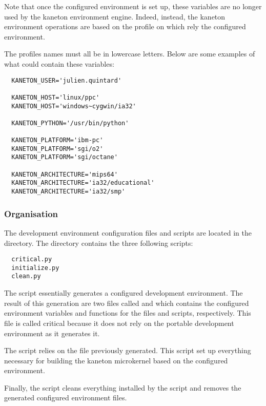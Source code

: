 Note that once the configured environment is set up, these variables are
no longer used by the kaneton environment engine. Indeed, instead, the
kaneton environment operations are based on the  profile on
which rely the configured environment.

The profiles names must all be in lowercase letters. Below are some examples
of what could contain these variables:

\begin{verbatim}
  KANETON_USER='julien.quintard'

  KANETON_HOST='linux/ppc'
  KANETON_HOST='windows~cygwin/ia32'

  KANETON_PYTHON='/usr/bin/python'

  KANETON_PLATFORM='ibm-pc'
  KANETON_PLATFORM='sgi/o2'
  KANETON_PLATFORM='sgi/octane'

  KANETON_ARCHITECTURE='mips64'
  KANETON_ARCHITECTURE='ia32/educational'
  KANETON_ARCHITECTURE='ia32/smp'
\end{verbatim}

%
%

\subsubsection{Organisation}

The development environment configuration files and scripts are located in
the  directory. The directory contains the three
following scripts:

\begin{verbatim}
  critical.py
  initialize.py
  clean.py
\end{verbatim}

The  script essentially generates a configured
development environment. The result of this generation are two files called
 and  which contains the configured
environment variables and functions for the  files and 
scripts, respectively. This file is called critical because it does not rely
on the portable development environment as it generates it.

The  script relies on the file 
previously generated. This script set up everything necessary for building the
kaneton microkernel based on the configured environment.

Finally, the  script cleans everything installed by the
 script and removes the generated configured
environment files.

